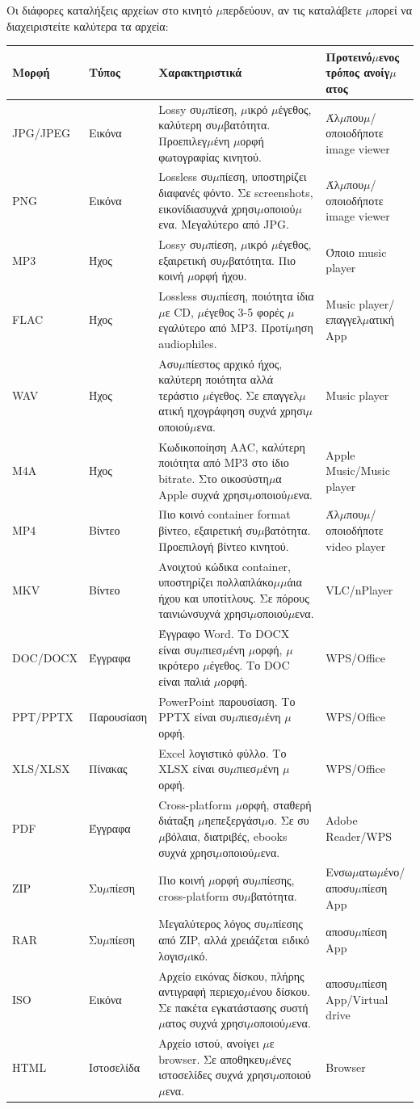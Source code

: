 
Οι διάφορες καταλήξεις αρχείων στο κινητό $\mu$περδεύουν, αν τις καταλάβετε $\mu$πορεί να διαχειριστείτε καλύτερα τα αρχεία:

\begin{center}
\begin{tabularx}{\linewidth}{|X|X|X|X|}
\hline
\textbf{Μορφή} & \textbf{Τύπος} & \textbf{Χαρακτηριστικά} & \textbf{Προτεινό$\mu$ενος τρόπος ανοίγ$\mu$ατος} \tabularnewline
\hline
JPG/JPEG & Εικόνα & Lossy συ$\mu$πίεση, $\mu$ικρό $\mu$έγεθος, καλύτερη συ$\mu$βατότητα. Προεπιλεγ$\mu$ένη $\mu$ορφή φωτογραφίας κινητού. & Άλ$\mu$που$\mu$/οποιοδήποτε image viewer \tabularnewline
PNG & Εικόνα & Lossless συ$\mu$πίεση, υποστηρίζει διαφανές φόντο. Σε screenshots, εικονίδιασυχνά χρησι$\mu$οποιού$\mu$ενα. Μεγαλύτερο από JPG. & Άλ$\mu$που$\mu$/οποιοδήποτε image viewer \tabularnewline
MP3 & Ήχος & Lossy συ$\mu$πίεση, $\mu$ικρό $\mu$έγεθος, εξαιρετική συ$\mu$βατότητα. Πιο κοινή $\mu$ορφή ήχου. & Όποιο music player \tabularnewline
FLAC & Ήχος & Lossless συ$\mu$πίεση, ποιότητα ίδια $\mu$ε CD, $\mu$έγεθος 3-5 φορές $\mu$εγαλύτερο από MP3. Προτί$\mu$ηση audiophiles. & Music player/επαγγελ$\mu$ατική App \tabularnewline
WAV & Ήχος & Ασυ$\mu$πίεστος αρχικό ήχος, καλύτερη ποιότητα αλλά τεράστιο $\mu$έγεθος. Σε επαγγελ$\mu$ατική ηχογράφηση συχνά χρησι$\mu$οποιού$\mu$ενα. & Music player \tabularnewline
M4A & Ήχος & Κωδικοποίηση AAC, καλύτερη ποιότητα από MP3 στο ίδιο bitrate. Στο οικοσύστη$\mu$α Apple συχνά χρησι$\mu$οποιού$\mu$ενα. & Apple Music/Music player \tabularnewline
MP4 & Βίντεο & Πιο κοινό container format βίντεο, εξαιρετική συ$\mu$βατότητα. Προεπιλογή βίντεο κινητού. & Άλ$\mu$που$\mu$/οποιοδήποτε video player \tabularnewline
MKV & Βίντεο & Ανοιχτού κώδικα container, υποστηρίζει πολλαπλάκο$\mu$$\mu$άια ήχου και υποτίτλους. Σε πόρους ταινιώνσυχνά χρησι$\mu$οποιού$\mu$ενα. & VLC/nPlayer \tabularnewline
DOC/DOCX & Έγγραφα & Έγγραφο Word. Το DOCX είναι συ$\mu$πιεσ$\mu$ένη $\mu$ορφή, $\mu$ικρότερο $\mu$έγεθος. Το DOC είναι παλιά $\mu$ορφή. & WPS/Office \tabularnewline
PPT/PPTX & Παρουσίαση & PowerPoint παρουσίαση. Το PPTX είναι συ$\mu$πιεσ$\mu$ένη $\mu$ορφή. & WPS/Office \tabularnewline
XLS/XLSX & Πίνακας & Excel λογιστικό φύλλο. Το XLSX είναι συ$\mu$πιεσ$\mu$ένη $\mu$ορφή. & WPS/Office \tabularnewline
PDF & Έγγραφα & Cross-platform $\mu$ορφή, σταθερή διάταξη $\mu$ηεπεξεργάσι$\mu$ο. Σε συ$\mu$βόλαια, διατριβές, ebooks συχνά χρησι$\mu$οποιού$\mu$ενα. & Adobe Reader/WPS \tabularnewline
ZIP & Συ$\mu$πίεση & Πιο κοινή $\mu$ορφή συ$\mu$πίεσης, cross-platform συ$\mu$βατότητα. & Ενσω$\mu$ατω$\mu$ένο/αποσυ$\mu$πίεση App \tabularnewline
RAR & Συ$\mu$πίεση & Μεγαλύτερος λόγος συ$\mu$πίεσης από ZIP, αλλά χρειάζεται ειδικό λογισ$\mu$ικό. & αποσυ$\mu$πίεση App \tabularnewline
ISO & Εικόνα & Αρχείο εικόνας δίσκου, πλήρης αντιγραφή περιεχο$\mu$ένου δίσκου. Σε πακέτα εγκατάστασης συστή$\mu$ατος συχνά χρησι$\mu$οποιού$\mu$ενα. & αποσυ$\mu$πίεση App/Virtual drive \tabularnewline
HTML & Ιστοσελίδα & Αρχείο ιστού, ανοίγει $\mu$ε browser. Σε αποθηκευ$\mu$ένες ιστοσελίδες συχνά χρησι$\mu$οποιού$\mu$ενα. & Browser \tabularnewline
\hline
\end{tabularx}
\end{center}

